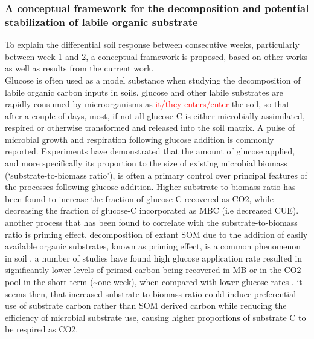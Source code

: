 \documentclass[12pt]{report}
\newcommand{\myRed}[1]{\textcolor{red}{#1}} %
\begin{document}
\subsubsection{A conceptual framework for the decomposition and potential stabilization of labile organic substrate}
To explain the differential soil response between consecutive weeks, particularly between week 1 and 2, a conceptual framework is proposed, based on other works as well as results from the current work.\\
Glucose is often used as a model substance when studying the decomposition of labile organic carbon inputs in soils\citep{kuzyakov2010}. glucose and other labile substrates are rapidly consumed by microorganisms as \myRed{it/they enters/enter} the soil, so that after a couple of days, most, if not all glucose-C is either microbially assimilated, respired or otherwise transformed and released into the soil matrix\citep{fischer2010}. A pulse of microbial growth and respiration following glucose addition is commonly reported. 
Experiments have demonstrated that the amount of glucose applied, and more specifically its proportion to the size of existing microbial biomass (‘substrate-to-biomass ratio’), is often a primary control over principal features of the processes following  glucose addition. Higher substrate-to-biomass ratio has been found to increase the fraction of glucose-C recovered as CO2, while decreasing the fraction of glucose-C incorporated as MBC (i.e decreased CUE)\citep{schneckenberger2008, tian2015}.
another process that has been found to correlate with the substrate-to-biomass ratio is priming effect. decomposition of extant SOM due to the addition of easily available organic substrates, known as priming effect, is a common phenomenon in soil \citep{kuzyakov2010}. a number of studies have found  high glucose application rate resulted in significantly lower levels of primed carbon being recovered in MB or in the  CO2 pool in the short term (\~{}one week), when compared with lower glucose rates \citep{blagodatskaya2011, schneckenberger2008, wu1993}.
it seems then, that increased substrate-to-biomass ratio could induce preferential use of substrate carbon rather than SOM derived carbon while reducing the efficiency of microbial substrate use, causing higher proportions of substrate C to be respired as CO2. 
\end{document}
